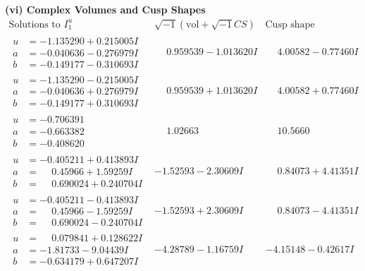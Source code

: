 \documentclass[1p]{elsarticle_modified}
\theoremstyle{definition}
\newcommand{\I}{\sqrt{-1}}
\begin{document}
\newpage\flushleft \textbf{(vi) Complex Volumes and Cusp Shapes}
$$\begin{array}{c|c|c}  
\text{Solutions to }I^u_{1}& \I (\text{vol} + \sqrt{-1}CS) & \text{Cusp shape}\\
 \hline 
\begin{aligned}
u &= -1.135290 + 0.215005 I \\
a &= -0.040636 - 0.276979 I \\
b &= -0.149177 - 0.310693 I\end{aligned}
 & \phantom{-}0.959539 - 1.013620 I & \phantom{-}4.00582 - 0.77460 I \\ \hline\begin{aligned}
u &= -1.135290 - 0.215005 I \\
a &= -0.040636 + 0.276979 I \\
b &= -0.149177 + 0.310693 I\end{aligned}
 & \phantom{-}0.959539 + 1.013620 I & \phantom{-}4.00582 + 0.77460 I \\ \hline\begin{aligned}
u &= -0.706391\phantom{ +0.000000I} \\
a &= -0.663382\phantom{ +0.000000I} \\
b &= -0.408620\phantom{ +0.000000I}\end{aligned}
 & \phantom{-}1.02663\phantom{ +0.000000I} & \phantom{-}10.5660\phantom{ +0.000000I} \\ \hline\begin{aligned}
u &= -0.405211 + 0.413893 I \\
a &= \phantom{-}0.45966 + 1.59259 I \\
b &= \phantom{-}0.690024 + 0.240704 I\end{aligned}
 & -1.52593 - 2.30609 I & \phantom{-}0.84073 + 4.41351 I \\ \hline\begin{aligned}
u &= -0.405211 - 0.413893 I \\
a &= \phantom{-}0.45966 - 1.59259 I \\
b &= \phantom{-}0.690024 - 0.240704 I\end{aligned}
 & -1.52593 + 2.30609 I & \phantom{-}0.84073 - 4.41351 I \\ \hline\begin{aligned}
u &= \phantom{-}0.079841 + 0.128622 I \\
a &= -1.81733 - 9.04439 I \\
b &= -0.634179 + 0.647207 I\end{aligned}
 & -4.28789 - 1.16759 I & -4.15148 - 0.42617 I \\ \hline\begin{aligned}

\end{aligned}
\end{array}$$
\end{document}
